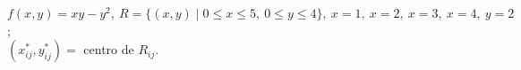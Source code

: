 \item $f(x, y) = xy - y^2, \ R = \{(x, y) \mid 0 \le x \le 5, \ 0 \le y \le 4\}, \ x = 1, \ x = 2, \ x = 3, \ x = 4, \ y = 2$; \\ $(x_{ij}^*, y_{ij}^*) =$ centro de $R_{ij}$.
